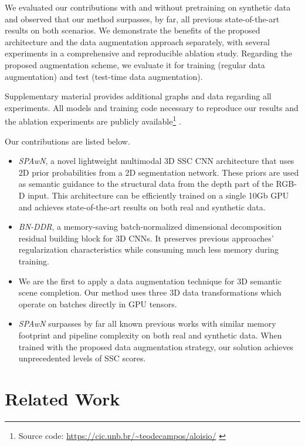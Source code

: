 We evaluated our contributions with and without pretraining on synthetic data and observed that our method surpasses, by far, all previous state-of-the-art results on both scenarios.  We demonstrate the benefits of the proposed architecture and the data augmentation approach separately, with several experiments in a comprehensive and reproducible ablation study. 
Regarding the proposed augmentation scheme, we evaluate it for training (regular data augmentation) and test (test-time data augmentation). 

 Supplementary material provides additional graphs and data regarding all experiments. All models and training code necessary to reproduce our results and the ablation experiments are publicly available\footnote{Source code:\scriptsize{ \url{https://cic.unb.br/~teodecampos/aloisio/}
 }} .

Our contributions are listed below.
\begin{itemize}
	\item \emph{SPAwN}, a novel lightweight multimodal 3D SSC CNN architecture that uses 2D prior probabilities from a 2D segmentation network. These priors are used as semantic guidance to the structural data from the depth part of the RGB-D input. This architecture can be efficiently trained on a single 10Gb GPU and achieves state-of-the-art results on both real and synthetic data.
    \item \emph{BN-DDR}, a memory-saving batch-normalized dimensional decomposition residual building block for 3D CNNs. It preserves previous approaches' regularization characteristics while consuming much less memory during training.
	\item 
We are the first to apply a data augmentation technique for 3D semantic scene completion. Our method uses three 3D data transformations which operate on batches directly in GPU tensors. 
	\item \emph{SPAwN} surpasses by far all known previous works with similar memory footprint and pipeline complexity on both real and synthetic data. When trained with the proposed data augmentation strategy, our solution achieves unprecedented levels of SSC scores.
\end{itemize}



\section{Related Work}



